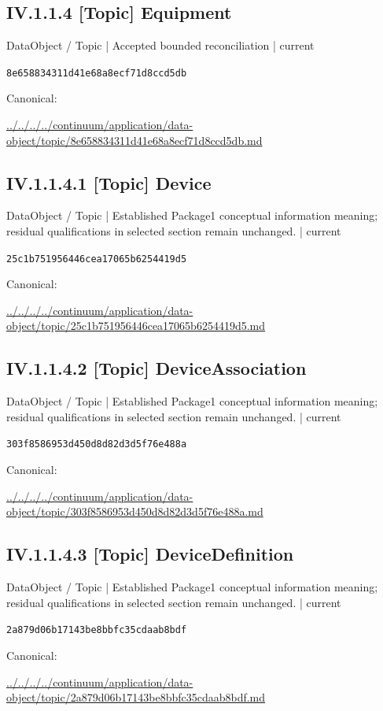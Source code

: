\documentclass[10pt,a4paper]{article}
\begin{document}
\subsection*{IV.1.1.4 [Topic] Equipment}
{\small DataObject / Topic | Accepted bounded reconciliation | current}\par
\texttt{8e658834311d41e68a8ecf71d8ccd5db}\par
Canonical: \par
{\footnotesize\url{../../../../continuum/application/data-object/topic/8e658834311d41e68a8ecf71d8ccd5db.md}}\par
\subsection*{IV.1.1.4.1 [Topic] Device}
{\small DataObject / Topic | Established Package1 conceptual information meaning; residual qualifications in selected section remain unchanged. | current}\par
\texttt{25c1b751956446cea17065b6254419d5}\par
Canonical: \par
{\footnotesize\url{../../../../continuum/application/data-object/topic/25c1b751956446cea17065b6254419d5.md}}\par
\subsection*{IV.1.1.4.2 [Topic] DeviceAssociation}
{\small DataObject / Topic | Established Package1 conceptual information meaning; residual qualifications in selected section remain unchanged. | current}\par
\texttt{303f8586953d450d8d82d3d5f76e488a}\par
Canonical: \par
{\footnotesize\url{../../../../continuum/application/data-object/topic/303f8586953d450d8d82d3d5f76e488a.md}}\par
\subsection*{IV.1.1.4.3 [Topic] DeviceDefinition}
{\small DataObject / Topic | Established Package1 conceptual information meaning; residual qualifications in selected section remain unchanged. | current}\par
\texttt{2a879d06b17143be8bbfc35cdaab8bdf}\par
Canonical: \par
{\footnotesize\url{../../../../continuum/application/data-object/topic/2a879d06b17143be8bbfc35cdaab8bdf.md}}\par
\end{document}
